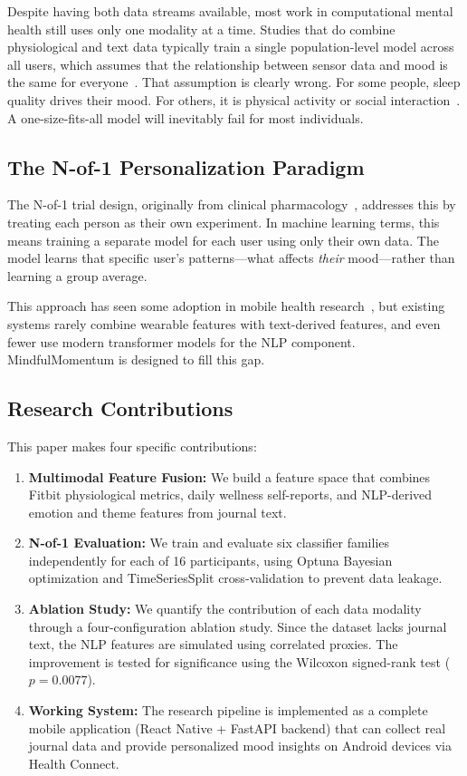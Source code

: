 \documentclass[conference]{IEEEtran}
\begin{document}
Despite having both data streams available, most work in computational mental health still uses only one modality at a time. Studies that do combine physiological and text data typically train a single population-level model across all users, which assumes that the relationship between sensor data and mood is the same for everyone~\cite{sano2018}. That assumption is clearly wrong. For some people, sleep quality drives their mood. For others, it is physical activity or social interaction~\cite{molenaar2009}. A one-size-fits-all model will inevitably fail for most individuals.

\subsection{The N-of-1 Personalization Paradigm}

The N-of-1 trial design, originally from clinical pharmacology~\cite{lillie2011}, addresses this by treating each person as their own experiment. In machine learning terms, this means training a separate model for each user using only their own data. The model learns that specific user's patterns---what affects \textit{their} mood---rather than learning a group average.

This approach has seen some adoption in mobile health research~\cite{suhara2017deepmood}, but existing systems rarely combine wearable features with text-derived features, and even fewer use modern transformer models for the NLP component. MindfulMomentum is designed to fill this gap.

\subsection{Research Contributions}

This paper makes four specific contributions:
\begin{enumerate}
    \item \textbf{Multimodal Feature Fusion:} We build a feature space that combines Fitbit physiological metrics, daily wellness self-reports, and NLP-derived emotion and theme features from journal text.
    \item \textbf{N-of-1 Evaluation:} We train and evaluate six classifier families independently for each of 16 participants, using Optuna Bayesian optimization and TimeSeriesSplit cross-validation to prevent data leakage.
    \item \textbf{Ablation Study:} We quantify the contribution of each data modality through a four-configuration ablation study. Since the dataset lacks journal text, the NLP features are simulated using correlated proxies. The improvement is tested for significance using the Wilcoxon signed-rank test ($p = 0.0077$).
    \item \textbf{Working System:} The research pipeline is implemented as a complete mobile application (React Native + FastAPI backend) that can collect real journal data and provide personalized mood insights on Android devices via Health Connect.
\end{enumerate}
\end{document}
